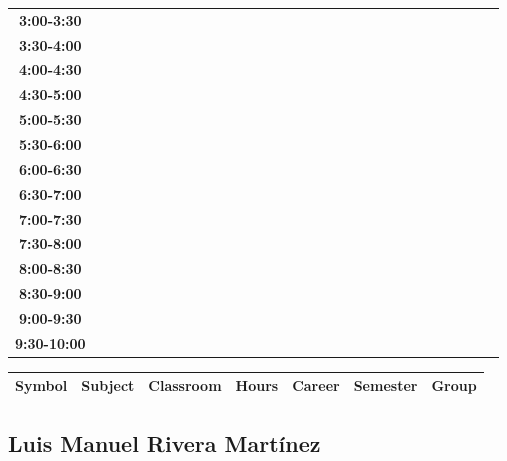 \documentclass{article}
\begin{document}
\begin{table}[ht]
\begin{tabular}{|c|c|c|c|c|c|c|c|c|c|c|c|c|c|c|c|c|c|c|c|c|c|c|c|c|c|c|c|c|c|}
\textbf{3:00-3:30} &   &   &   &   &   &   &   \\
 \cline{1-8} 
\textbf{3:30-4:00} &   &   &   &   &   &   &   \\
 \cline{1-8} 
\textbf{4:00-4:30} &   &   &   &   &   &   &   \\
 \cline{1-8} 
\textbf{4:30-5:00} &   &   &   &   &   &   &   \\
 \cline{1-8} 
\textbf{5:00-5:30} &   &   &   &   &   &   &   \\
 \cline{1-8} 
\textbf{5:30-6:00} &   &   &   &   &   &   &   \\
 \cline{1-8} 
\textbf{6:00-6:30} &   &   &   &   &   &   &   \\
 \cline{1-8} 
\textbf{6:30-7:00} &   &   &   &   &   &   &   \\
 \cline{1-8} 
\textbf{7:00-7:30} &   &   &   &   &   &   &   \\
 \cline{1-8} 
\textbf{7:30-8:00} &   &   &   &   &   &   &   \\
 \cline{1-8} 
\textbf{8:00-8:30} &   &   &   &   &   &   &   \\
 \cline{1-8} 
\textbf{8:30-9:00} &   &   &   &   &   &   &   \\
 \cline{1-8} 
\textbf{9:00-9:30} &   &   &   &   &   &   &   \\
 \cline{1-8} 
\textbf{9:30-10:00} &   &   &   &   &   &   &   \\
 \cline{1-8} 
\end{tabular}\end{table}

        
        \begin{tabular}{|>{\centering\arraybackslash}m{2cm}|>{\centering\arraybackslash}m{4cm}|>{\centering\arraybackslash}m{2cm}|>{\centering\arraybackslash}m{2cm}|>{\centering\arraybackslash}m{2cm}|>{\centering\arraybackslash}m{2cm}|>{\centering\arraybackslash}m{2cm}|}
        \hline
        \textbf{Symbol} & \textbf{Subject} & \textbf{Classroom} & \textbf{Hours} & \textbf{Career} & \textbf{Semester} & \textbf{Group} \\
        \hline
        \end{tabular}
                    

        \newpage
        

        \subsection{Luis Manuel Rivera Mart\'inez}
        \vspace*{.1cm}
        
\end{document}

